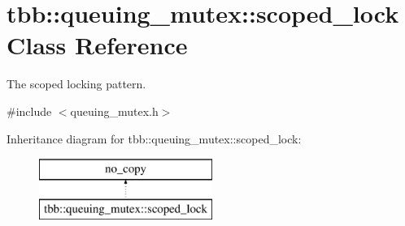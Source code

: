 \hypertarget{classtbb_1_1queuing__mutex_1_1scoped__lock}{}\section{tbb\+:\+:queuing\+\_\+mutex\+:\+:scoped\+\_\+lock Class Reference}
\label{classtbb_1_1queuing__mutex_1_1scoped__lock}


The scoped locking pattern.  




{\ttfamily \#include $<$queuing\+\_\+mutex.\+h$>$}

Inheritance diagram for tbb\+:\+:queuing\+\_\+mutex\+:\+:scoped\+\_\+lock\+:\begin{figure}[H]
\begin{center}
\leavevmode
\includegraphics[height=2.000000cm]{classtbb_1_1queuing__mutex_1_1scoped__lock}
\end{center}
\end{figure}
